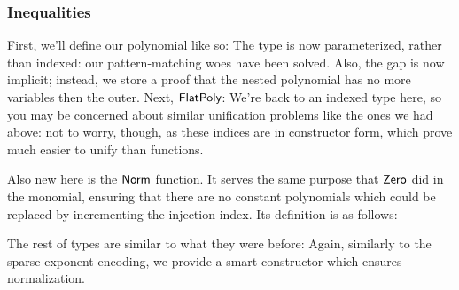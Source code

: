 \documentclass[draft, twocolumn]{article}
\theoremstyle{definition}
\theoremstyle{remark}
\begin{document}
\subsubsection{Inequalities}
First, we'll define our polynomial like so:
The type is now parameterized, rather than indexed: our pattern-matching woes
have been solved. Also, the gap is now implicit; instead, we store a proof that
the nested polynomial has no more variables then the outer. Next,
\(\AgdaDatatype{FlatPoly}\):
We're back to an indexed type here, so you may be concerned about similar
unification problems like the ones we had above: not to worry, though, as these
indices are in constructor form, which prove much easier to unify than
functions.

Also new here is the \(\AgdaFunction{Norm}\) function. It serves the same
purpose that \(\AgdaFunction{Zero}\) did in the monomial, ensuring that there
are no constant polynomials which could be replaced by incrementing the
injection index. Its definition is as follows:

The rest of types are similar to what they were before:
Again, similarly to the sparse exponent encoding, we provide a smart
constructor which ensures normalization.
\end{document}
